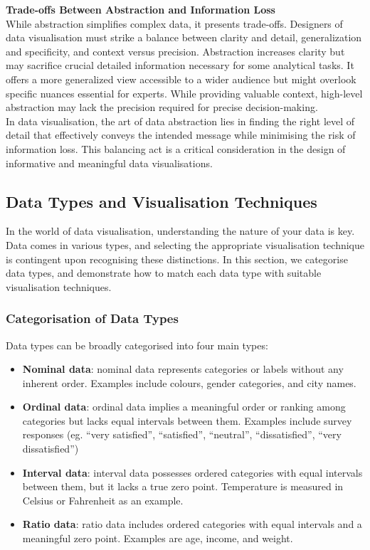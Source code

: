 \documentclass{article}\usepackage[]{graphicx}\usepackage[]{xcolor}
\begin{document}
\noindent 
\textbf{Trade-offs Between Abstraction and Information Loss}\\

\noindent
While abstraction simplifies complex data, it presents trade-offs. Designers of data visualisation must strike a balance between clarity and detail, generalization and specificity, and context versus precision. Abstraction increases clarity but may sacrifice crucial detailed information necessary for some analytical tasks. It offers a more generalized view accessible to a wider audience but might overlook specific nuances essential for experts. While providing valuable context, high-level abstraction may lack the precision required for precise decision-making.\\

\noindent
In data visualisation, the art of data abstraction lies in finding the right level of detail that effectively conveys the intended message while minimising the risk of information loss. This balancing act is a critical consideration in the design of informative and meaningful data visualisations.


\subsection{Data Types and Visualisation Techniques}

In the world of data visualisation, understanding the nature of your data is key. Data comes in various types, and selecting the appropriate visualisation technique is contingent upon recognising these distinctions. In this section, we categorise data types, and demonstrate how to match each data type with suitable visualisation techniques.

\subsubsection{Categorisation of Data Types}

Data types can be broadly categorised into four main types: 

\begin{itemize}
    \item \textbf{Nominal data}: nominal data represents categories or labels without any inherent order. Examples include colours, gender categories, and city names. 
    \item \textbf{Ordinal data}: ordinal data implies a meaningful order or ranking among categories but lacks equal intervals between them. Examples include survey responses (eg. “very satisfied”, “satisfied”, “neutral”, “dissatisfied”, “very dissatisfied”)
    \item \textbf{Interval data}: interval data possesses ordered categories with equal intervals between them, but it lacks a true zero point. Temperature is measured in Celsius or Fahrenheit as an example. 
    \item \textbf{Ratio data}: ratio data includes ordered categories with equal intervals and a meaningful zero point. Examples are age, income, and weight. 
\end{itemize}
\end{document}
